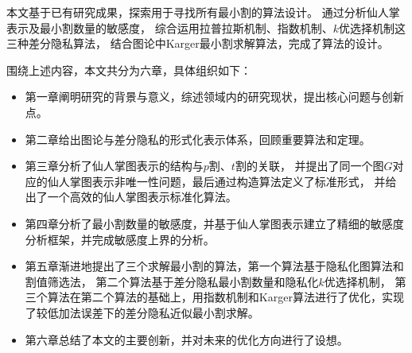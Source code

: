本文基于已有研究成果，探索用于寻找所有最小割的算法设计。
通过分析仙人掌表示及最小割数量的敏感度，
综合运用拉普拉斯机制、指数机制、$k$优选择机制这三种差分隐私算法，
结合图论中Karger最小割求解算法，完成了算法的设计。


围绕上述内容，本文共分为六章，具体组织如下：
\begin{itemize}
    \item 第一章阐明研究的背景与意义，综述领域内的研究现状，提出核心问题与创新点。
    \item 第二章给出图论与差分隐私的形式化表示体系，回顾重要算法和定理。
    \item 第三章分析了仙人掌图表示的结构与$p$割、$t$割的关联，
    并提出了同一个图$G$对应的仙人掌图表示非唯一性问题，最后通过构造算法定义了标准形式，
    并给出了一个高效的仙人掌图表示标准化算法。
    \item 第四章分析了最小割数量的敏感度，并基于仙人掌图表示建立了精细的敏感度分析框架，并完成敏感度上界的分析。
    \item 第五章渐进地提出了三个求解最小割的算法，第一个算法基于隐私化图算法和割值筛选法，
    第二个算法基于差分隐私最小割数量和隐私化$k$优选择机制，
    第三个算法在第二个算法的基础上，用指数机制和Karger算法进行了优化，实现了较低加法误差下的差分隐私近似最小割求解。
    \item 第六章总结了本文的主要创新，并对未来的优化方向进行了设想。
\end{itemize}

